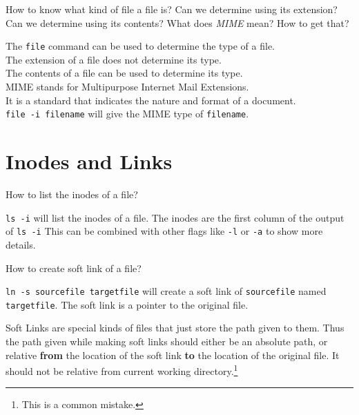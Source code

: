 \begin{qs}
  How to know what kind of file a file is? Can we determine using
  its extension? Can we determine using its contents? What does
  \textit{MIME} mean?
How to get that?
\end{qs}

\begin{ans}
  The \texttt{file} command can be used to determine the type of a file. \\
  The extension of a file does not determine its type. \\
  The contents of a file can be used to determine its type. \\
  MIME stands for Multipurpose Internet Mail Extensions. \\
  It is a standard that indicates the nature and format of a document. \\
  \texttt{file -i filename} will give the MIME type of \texttt{filename}.
\end{ans}


\vfill
\pagebreak
\section{Inodes and Links}

\begin{qs}
  How to list the inodes of a file?
\end{qs}

\begin{ans}
  \texttt{ls -i} will list the inodes of a file.
  The inodes are the first column of the output of \texttt{ls -i}
  This can be combined with other flags like \texttt{-l} or \texttt{-a} to show more details.
\end{ans}

\begin{qs}
  How to create soft link of a file?
\end{qs}

\begin{ans}
  \texttt{ln -s sourcefile targetfile} will create a soft link of \texttt{sourcefile}
  named \texttt{targetfile}.
  The soft link is a pointer to the original file.
\end{ans}

\begin{definition}
  Soft Links are special kinds of files that just store the path
  given to them. Thus the path given while making soft links should
  either be an absolute path, or relative \textbf{from} the location of the
  soft link \textbf{to} the location of the original file. It should not be
  relative from current working directory.\footnote{This is a common mistake.}
\end{definition}

